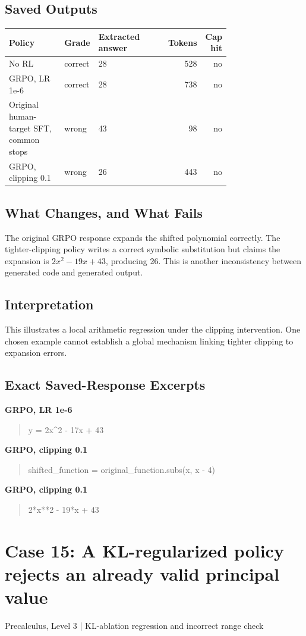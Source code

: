 \documentclass[10pt,letterpaper]{article}
\begin{document}
\subsection*{Saved Outputs}
\small\begin{longtable}{p{0.29\linewidth}p{0.10\linewidth}p{0.35\linewidth}rr}\toprule Policy & Grade & Extracted answer & Tokens & Cap hit\\\midrule
No RL & correct & 28 & 528 & no\\
GRPO, LR 1e-6 & correct & 28 & 738 & no\\
Original human-target SFT, common stops & wrong & 43 & 98 & no\\
GRPO, clipping 0.1 & wrong & 26 & 443 & no\\
\bottomrule\end{longtable}\normalsize
\subsection*{What Changes, and What Fails}
The original GRPO response expands the shifted polynomial correctly. The tighter-clipping policy writes a correct symbolic substitution but claims the expansion is $2x^2-19x+43$, producing 26. This is another inconsistency between generated code and generated output.
\subsection*{Interpretation}
This illustrates a local arithmetic regression under the clipping intervention. One chosen example cannot establish a global mechanism linking tighter clipping to expansion errors.
\subsection*{Exact Saved-Response Excerpts}
\textbf{GRPO, LR 1e-6}
\begin{quote}\small\raggedright y = 2x\textasciicircum{}2 - 17x + 43\end{quote}
\textbf{GRPO, clipping 0.1}
\begin{quote}\small\raggedright shifted\_function = original\_function.subs(x, x - 4)\end{quote}
\textbf{GRPO, clipping 0.1}
\begin{quote}\small\raggedright 2*x**2 - 19*x + 43\end{quote}
\clearpage\section*{Case 15: A KL-regularized policy rejects an already valid principal value}
Precalculus, Level 3 | KL-ablation regression and incorrect range check
\end{document}
